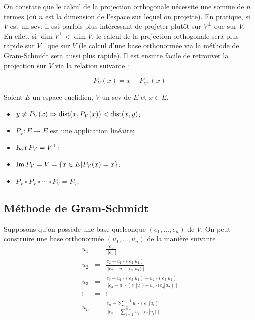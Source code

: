 \begin{myrem}
On constate que le calcul de la projection orthogonale nécessite une somme de $n$ termes
(où $n$ est la dimension de l'espace sur lequel on projette). En pratique, si $V$ est un
sev, il est parfois plus intéressant de projeter plutôt sur $V^{\perp}$ que sur $V$. En
effet, si $\dim V^{\perp} < \dim V$, le calcul de la projection orthogonale sera plus rapide
sur $V^{\perp}$ que sur $V$ (le calcul d'une base orthonormée via la méthode de Gram-Schmidt
sera aussi plus rapide). Il est ensuite facile de retrouver la projection sur $V$ via
la relation suivante :

\[ P_V(x) = x - P_{V^{\perp}}(x) \]
\end{myrem}

\begin{myprop}
	Soient $E$ un espace euclidien, $V$ un sev de $E$ et $x \in E$.
	\begin{itemize}
		\item $y \neq P_V(x) \Rightarrow \operatorname{dist}(x, P_V(x)) < \operatorname{dist}(x, y)$;
		\item $P_V : E \to E$ est une application linéaire;
		\item $\operatorname{Ker} P_V = V^{\perp}$;
		\item $\operatorname{Im} P_V = V = \{x \in E | P_V(x) = x\}$;
		\item $P_V \circ P_V \circ \cdots \circ P_V = P_V$.
	\end{itemize}
\end{myprop}

\subsection{Méthode de Gram-Schmidt}

Supposons qu'on possède une base quelconque $(e_1, \dots , e_n)$ de $V$.
On peut construire une base orthonormée $(u_1, \dots, u_n)$ de la manière suivante
\begin{eqnarray*}
	u_1 &=& \frac{e_1}{||e_1||}\\
	u_2 &=& \frac{e_2 - u_1 \cdot (e_2|u_1)}{||e_2 - u_1 \cdot (e_2|u_1)||}\\
	u_3 &=& \frac{e_3 - u_1 \cdot (e_3|u_1) - u_2 \cdot (e_3|u_2)}{||e_3 - u_1 \cdot (e_3|u_1) - u_2 \cdot (e_3|u_2)||}\\
	\vdots &=& \vdots\\
	u_n &=& \frac{e_n - \sum_{i=1}^{n-1} u_i \cdot (e_n|u_i) }{ || e_n - \sum_{i=1}^{n-1} u_i \cdot (e_n|u_i) || }
\end{eqnarray*}

